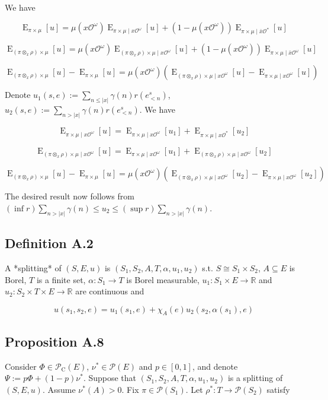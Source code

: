\documentclass[a4paper]{article}
\DeclareMathOperator{\E}{E}
\newcommand{\Reals}{\mathbb{R}}
\newcommand{\Abs}[1]{\lvert #1 \rvert}
\newcommand{\Prob}{\mathcal{P}}
\newcommand{\Obs}{\mathcal{O}}
\newcommand{\ObsO}{\Obs^\omega}
\newcommand{\CC}{\mathcal{P}_{\operatorname{C}}}
\begin{document}
We have

$$\E_{\pi \times \mu}[u] = \mu(x\ObsO) \E_{\pi \times \mu \mid x \ObsO}[u] + (1 - \mu(x\ObsO)) \E_{\pi \times \mu \mid \bar{x} \Obs^*}[u]$$

$$\E_{(\pi \otimes_x \rho) \times \mu}[u] = \mu(x\ObsO) \E_{(\pi \otimes_x \rho) \times \mu \mid x \ObsO}[u] + (1 - \mu(x\ObsO)) \E_{\pi \times \mu \mid \bar{x} \ObsO}[u]$$

$$\E_{(\pi \otimes_x \rho) \times \mu}[u]-\E_{\pi \times \mu}[u] = \mu(x\ObsO)(\E_{(\pi \otimes_x \rho) \times \mu \mid x \ObsO}[u]-\E_{\pi \times \mu \mid x \ObsO}[u])$$

Denote ${u_1(s,e):=\sum_{n \leq \Abs{x}} \gamma(n) r(e^s_{<n})}$, ${u_2(s,e):=\sum_{n > \Abs{x}} \gamma(n) r(e^s_{<n})}$. We have

$$\E_{\pi \times \mu \mid x \ObsO}[u] = \E_{\pi \times \mu \mid x \ObsO}[u_1] + \E_{\pi \times \mu \mid x \Obs^*}[u_2]$$

$$\E_{(\pi \otimes_x \rho) \times \mu \mid x \ObsO}[u] = \E_{\pi \times \mu \mid x \ObsO}[u_1] + \E_{(\pi \otimes_x \rho) \times \mu \mid x \ObsO}[u_2]$$

$$\E_{(\pi \otimes_x \rho) \times \mu}[u]-\E_{\pi \times \mu}[u] = \mu(x\ObsO)(\E_{(\pi \otimes_x \rho) \times \mu \mid x \ObsO}[u_2]-\E_{\pi \times \mu \mid x \ObsO}[u_2])$$

The desired result now follows from ${(\inf r) \sum_{n > \Abs{x}} \gamma(n) \leq u_2 \leq (\sup r) \sum_{n > \Abs{x}} \gamma(n)}$.

\subsection{Definition A.2}

A *splitting* of ${(S,E,u)}$ is ${(S_1,S_2,A,T,\alpha,u_1,u_2)}$ s.t. ${S \cong S_1 \times S_2}$, ${A \subseteq E}$ is Borel, ${T}$ is a finite set, ${\alpha: S_1 \rightarrow T}$ is Borel measurable, ${u_1: S_1 \times E \rightarrow \Reals}$ and ${u_2: S_2 \times T \times E \rightarrow \Reals}$ are continuous and

$$u(s_1,s_2,e) = u_1(s_1,e) + \chi_A(e) u_2(s_2, \alpha(s_1), e)$$

\subsection{Proposition A.8}

Consider ${\Phi \in \CC(E)}$, ${\nu^* \in \Prob(E)}$ and ${p \in [0,1]}$, and denote ${\Psi:=p\Phi+(1-p)\nu^*}$. Suppose that ${(S_1,S_2,A,T,\alpha,u_1,u_2)}$ is a splitting of ${(S,E,u)}$. Assume ${\nu^*(A) > 0}$. Fix ${\pi \in \Prob(S_1)}$.  Let ${\rho^*: T \rightarrow \Prob(S_2)}$ satisfy
\end{document}
